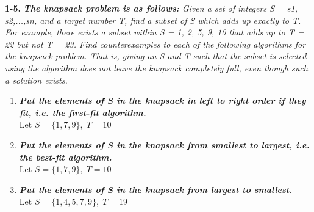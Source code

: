 \textbf{1-5.} \emph{\textbf{The knapsack problem is as follows:} Given a set of integers S = {s1, s2,...,sn},
and a target number T, find a subset of S which adds up exactly to T. For example,
there exists a subset within S = {1, 2, 5, 9, 10} that adds up to T = 22 but not
T = 23.
Find counterexamples to each of the following algorithms for the knapsack problem.
That is, giving an S and T such that the subset is selected using the algorithm does
not leave the knapsack completely full, even though such a solution exists.}
	
		\begin{enumerate}[label=(\alph*)]
		\itemsep1pt\parskip0pt
			\item{\emph{\textbf{Put the elements of S in the knapsack in left to right order if they fit, i.e. the first-fit algorithm.}} \\
				Let $S = \{1,7,9\}, \; T = 10$
			}
			\item{\emph{\textbf{Put the elements of S in the knapsack from smallest to largest, i.e. the best-fit algorithm.}} \\
				Let $S = \{1,7,9\}, \; T = 10$
			}
			\item{\emph{\textbf{Put the elements of S in the knapsack from largest to smallest.}} \\
				Let $S = \{1,4,5,7,9\}, \; T = 19$
			}
		\end{enumerate}


